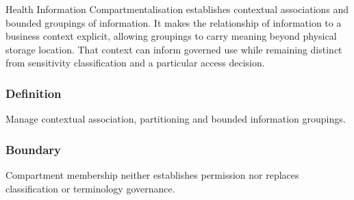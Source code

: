 Health Information Compartmentalisation establishes contextual associations and bounded groupings of information. It makes the relationship of information to a business context explicit, allowing groupings to carry meaning beyond physical storage location. That context can inform governed use while remaining distinct from sensitivity classification and a particular access decision.

\subsubsection*{Definition}

Manage contextual association, partitioning and bounded information groupings.

\subsubsection*{Boundary}

Compartment membership neither establishes permission nor replaces classification or terminology governance.

